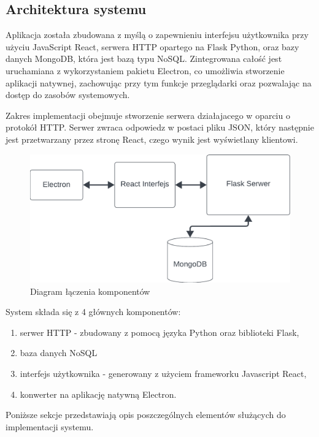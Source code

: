 \documentclass[12pt,a4paper,twoside]{article}
\begin{document}
\subsection{Architektura systemu} 
Aplikacja została zbudowana z myślą o zapewnieniu interfejsu użytkownika przy użyciu JavaScript React, serwera HTTP opartego na Flask Python, oraz bazy danych MongoDB, która jest bazą typu NoSQL. Zintegrowana całość jest uruchamiana z wykorzystaniem pakietu Electron, co umożliwia stworzenie aplikacji natywnej, zachowując przy tym funkcje przeglądarki oraz pozwalając na dostęp do zasobów systemowych.\par
Zakres implementacji obejmuje stworzenie serwera działajacego w oparciu o protokół HTTP. Serwer zwraca odpowiedz w postaci pliku JSON, który następnie jest przetwarzany przez stronę React, czego wynik jest wyświetlany klientowi.\par
\begin{figure}[h!]
\centering
  \includegraphics[width=\textwidth]{img/archi.png}
  \caption{Diagram łączenia komponentów}
\end{figure}
System składa się z 4 głównych komponentów:
\begin{enumerate}
	\item serwer HTTP - zbudowany z pomocą języka Python oraz biblioteki Flask,
	\item baza danych NoSQL
	\item interfejs użytkownika - generowany z użyciem frameworku Javascript React,
	\item konwerter na aplikację natywną Electron.
\end{enumerate}
Poniższe sekcje przedstawiają opis poszczególnych elementów służących do implementacji systemu. 
\end{document}
